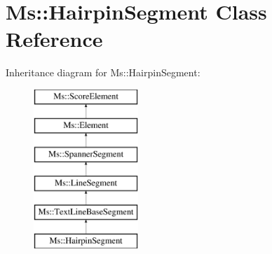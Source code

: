 \hypertarget{class_ms_1_1_hairpin_segment}{}\section{Ms\+:\+:Hairpin\+Segment Class Reference}
\label{class_ms_1_1_hairpin_segment}
Inheritance diagram for Ms\+:\+:Hairpin\+Segment\+:\begin{figure}[H]
\begin{center}
\leavevmode
\includegraphics[height=6.000000cm]{class_ms_1_1_hairpin_segment}
\end{center}
\end{figure}
